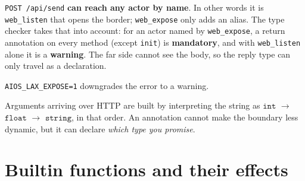 \documentclass[11pt,a4paper]{article}
\newcommand{\ty}[1]{\ensuremath{\mathtt{#1}}}
\begin{document}
\texttt{POST /api/send} \textbf{can reach any actor by name}. In other words it
is \texttt{web\_listen} that opens the border; \texttt{web\_expose} only adds an
alias. The type checker takes that into account: for an actor named by
\texttt{web\_expose}, a return annotation on every method (except \texttt{init})
is \textbf{mandatory}, and with \texttt{web\_listen} alone it is a
\textbf{warning}. The far side cannot see the body, so the reply type can only
travel as a declaration.

\texttt{AIOS\_LAX\_EXPOSE=1} downgrades the error to a warning.

Arguments arriving over HTTP are built by interpreting the string as \ty{int}
$\to$ \ty{float} $\to$ \ty{string}, in that order. An annotation cannot make
the boundary less dynamic, but it can declare \emph{which type you promise}.

\section{Builtin functions and their effects}
\label{sec:builtins}
\end{document}
